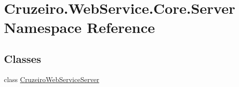 \hypertarget{namespace_cruzeiro_1_1_web_service_1_1_core_1_1_server}{}\section{Cruzeiro.\+Web\+Service.\+Core.\+Server Namespace Reference}
\label{namespace_cruzeiro_1_1_web_service_1_1_core_1_1_server}
\subsection*{Classes}
\begin{DoxyCompactItemize}
\item 
class \hyperlink{class_cruzeiro_1_1_web_service_1_1_core_1_1_server_1_1_cruzeiro_web_service_server}{Cruzeiro\+Web\+Service\+Server}
\end{DoxyCompactItemize}
